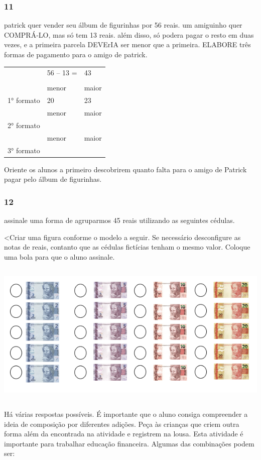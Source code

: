 \subsubsection{11}\label{section-18}

patrick quer vender seu álbum de figurinhas por 56 reais. um amiguinho
quer COMPRÁ-LO, mas só tem 13 reais. além disso, só podera pagar o resto
em duas vezes, e a primeira parcela DEVErIA ser menor que a primeira.
ELABORE três formas de pagamento para o amigo de patrick.

\begin{longtable}[]{@{}lll@{}}
\toprule
& 56 -- 13 = & 43\tabularnewline
& &\tabularnewline
& menor & maior\tabularnewline
1° formato & 20 & 23\tabularnewline
& menor & maior\tabularnewline
2° formato & &\tabularnewline
& menor & maior\tabularnewline
3° formato & &\tabularnewline
\bottomrule
\end{longtable}

Oriente os
alunos a primeiro descobrirem quanto falta para o amigo de Patrick pagar
pelo álbum de figurinhas.

\subsubsection{12}\label{section-19}

assinale uma forma de agruparmos 45 reais utilizando as seguintes
cédulas.

\textless{}Criar uma figura conforme o modelo a seguir. Se necessário
desconfigure as notas de reais, contanto que as cédulas fictícias tenham
o mesmo valor. Coloque uma bola para que o aluno assinale.

\includegraphics[width=5.90556in,height=2.71667in]{media/image18.png}

Há várias respostas possíveis. É
importante que o aluno consiga compreender a ideia de composição por
diferentes adições. Peça às crianças que criem outra forma além da
encontrada na atividade e registrem na lousa. Esta atividade é
importante para trabalhar educação financeira. Algumas das combinações
podem ser:

